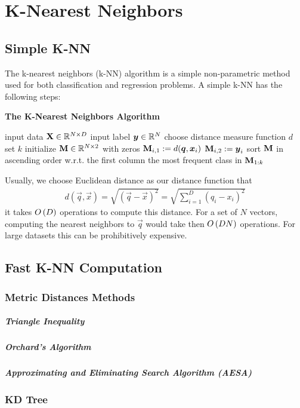 
\chapter{K-Nearest Neighbors}
\label{chapter5}



\section{Simple K-NN}
\label{section5.1}

The k-nearest neighbors (k-NN) algorithm is a simple non-parametric method used for both classification and regression problems. A simple k-NN has the following steps:
\begin{algorithm}[H]
	\caption*{\bf The K-Nearest Neighbors Algorithm}
	\begin{algorithmic}
		\State input data $\mathbf{X}\in\mathbb{R}^{N\times D}$
		\State input label $\boldsymbol{y}\in\mathbb{R}^N$
		\State choose distance measure function $d$
		\State set $k$
		\State initialize $\mathbf{M}\in\mathbb{R}^{N\times2}$ with zeros
		\State $\mathbf{M}_{i,1}:=d(\boldsymbol{q},\boldsymbol{x}_i)$
		\State $\mathbf{M}_{i,2}:=\boldsymbol{y}_i$
		\EndFor
		\State sort $\mathbf{M}$ in ascending order w.r.t. the first column
		\State \Return the most frequent class in $\mathbf{M}_{1:k}$
	\end{algorithmic}
\end{algorithm}
Usually, we choose Euclidean distance as our distance function that
\begin{align*}
	d(\vec{q},\vec{x})=\sqrt{(\vec{q}-\vec{x})^2}=\sqrt{\sum_{i=1}^D(q_i-x_i)^2}
\end{align*}
it takes $O\left(D\right)$ operations to compute this distance. For a set of $N$ vectors, computing the nearest neighbors to $\vec{q}$ would take then $O\left(DN\right)$ operations. For large datasets this can be prohibitively expensive.



\section{Fast K-NN Computation}
\label{section5.2}

\subsection{Metric Distances Methods}

\paragraph{Triangle Inequality}

\paragraph{Orchard's Algorithm}

\paragraph{Approximating and Eliminating Search Algorithm (AESA)}

\subsection{KD Tree}
